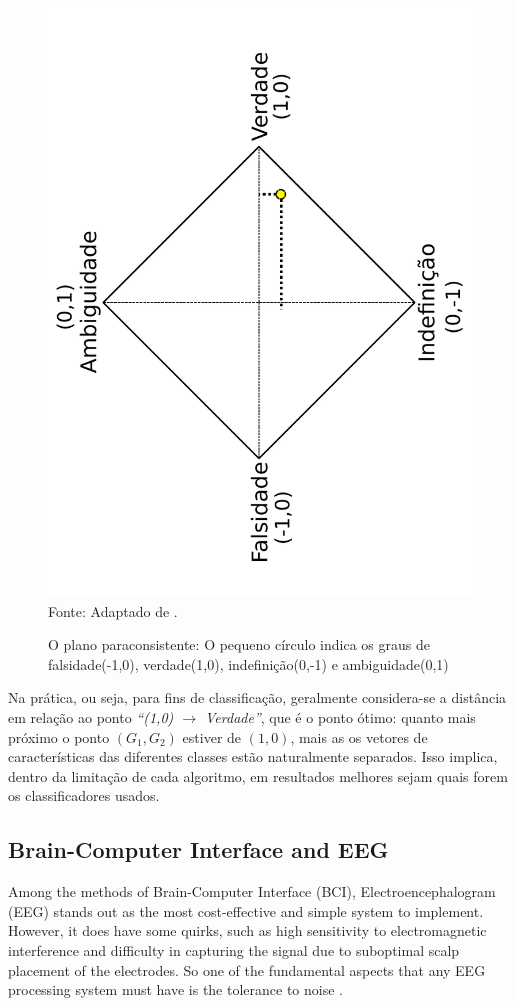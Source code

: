 			\begin{figure}[H]
				\centering
				\caption{O plano paraconsistente: O pequeno círculo indica os graus de falsidade(-1,0), verdade(1,0), indefinição(0,-1) e ambiguidade(0,1)}
				\includegraphics[angle=-90, width=0.69\linewidth]{images/paraconsistentPlane.pdf}
				\label{fig:paraconsistentplane}
				\\Fonte: Adaptado de \cite{8588433}.
			\end{figure}
			\par Na prática, ou seja, para fins de classificação, geralmente considera-se a distância em relação ao ponto \textit{``(1,0) $\rightarrow$ Verdade''}, que é o ponto ótimo: quanto mais próximo o ponto $(G_1,G_2)$ estiver de $(1,0)$, mais as os vetores de características das diferentes classes estão naturalmente separados. Isso implica, dentro da limitação de cada algoritmo, em resultados melhores sejam quais forem os classificadores usados.
	
	\subsection{Brain-Computer Interface and EEG}
		\par Among the methods of Brain-Computer Interface (BCI), Electroencephalogram (EEG) stands out as the most cost-effective and simple system to implement. However, it does have some quirks, such as high sensitivity to electromagnetic interference and difficulty in capturing the signal due to suboptimal scalp placement of the electrodes. So one of the fundamental aspects that any EEG processing system must have is the tolerance to noise \cite{JALALYBIDGOLY2020101788}.
		
